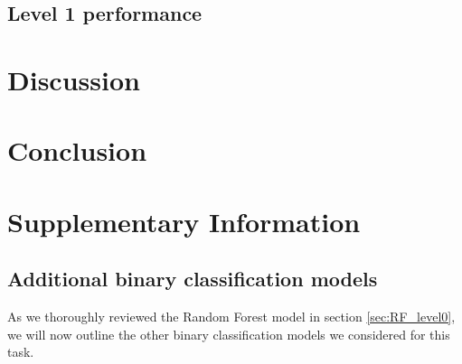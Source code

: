 \documentclass{bioinfo}
\begin{document}
\subsection{Level 1 performance}

%
%
%
%

\section{Discussion}

\section{Conclusion}

\section{Supplementary Information}

\subsection{Additional binary classification models}\label{sec:unused binarys}
As we thoroughly reviewed the Random Forest model in section \ref{sec:RF_level0}, we will now outline the other binary classification models we considered for this task.
\end{document}
